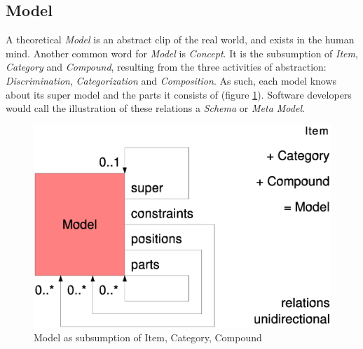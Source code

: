 %
%
%
%
%
%
%

\subsection{Model}
\label{model_heading}

A theoretical \emph{Model} is an abstract clip of the real world, and exists in
the human mind. Another common word for \emph{Model} is \emph{Concept}.
It is the subsumption of \emph{Item}, \emph{Category} and \emph{Compound},
resulting from the three activities of abstraction: \emph{Discrimination},
\emph{Categorization} and \emph{Composition}. As such, each model knows about
its super model and the parts it consists of (figure \ref{abstract_model_figure}).
Software developers would call the illustration of these relations a \emph{Schema}
or \emph{Meta Model}.

\begin{figure}[ht]
    \begin{center}
        \includegraphics[scale=0.3]{vector/abstract_model.eps}
        \caption{Model as subsumption of Item, Category, Compound}
        \label{abstract_model_figure}
    \end{center}
\end{figure}
